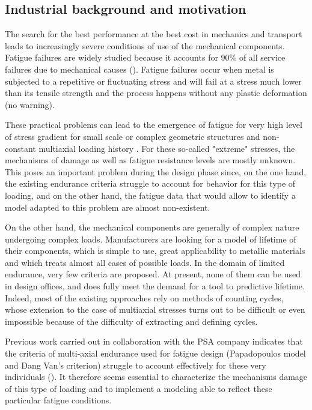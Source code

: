 \subsection{Industrial background and motivation}
The search for the best performance at the best cost in mechanics and
transport leads to increasingly
severe conditions of use of the mechanical components. Fatigue failures are widely studied
because it accounts for 90\% of all service
failures due to mechanical causes (\cite{sohar2011lifetime}).  Fatigue failures occur when metal is
subjected to a repetitive or fluctuating
stress and will fail at a stress much lower
than its tensile strength and the process happens without any plastic
deformation (no warning).

These practical problems can lead to the emergence of fatigue for
very high level of stress gradient for small scale or complex geometric structures and non-constant multiaxial loading history
. For these so-called "extreme" stresses, the mechanisms of damage
as well as fatigue resistance levels are mostly unknown.
This poses an important problem during the design phase since, on the one hand, the
existing endurance criteria struggle to account for behavior for this type of
loading, and on the other hand, the fatigue data that would allow to identify a model
adapted to this problem are almost non-existent.

On the other hand, the mechanical components are generally of complex nature undergoing
complex loads. Manufacturers are looking for a model of lifetime
of their components, which is simple to use, great applicability to metallic materials
and which treats almost all cases of possible loads. In the domain of
limited endurance, very few criteria are proposed. At present, none of them
can be used in design offices, and does fully meet the demand for a tool to
predictive lifetime. Indeed, most of the existing approaches rely on
methods of counting cycles, whose extension to the case of multiaxial stresses turns out to be
difficult or even impossible because of the difficulty of extracting and defining cycles.

Previous work carried out in collaboration with the PSA company indicates that the criteria
of multi-axial endurance used for fatigue design (Papadopoulos model
and Dang Van's criterion) struggle to account effectively for these very
individuals (\cite{koutiri2011effet}). It therefore seems essential to characterize the mechanisms
damage of this type of loading and to implement a modeling
able to reflect these particular fatigue conditions.

